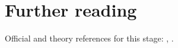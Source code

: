 \section{Further reading}
\label{sec:the_receipt:further_reading}
Official and theory references for this stage: \cite{CMS:2016lmd}, \cite{ATLAS:2014hvo}.

\begin{pitfalls}
\end{pitfalls}

\begin{exercises}
\item {}
\item {}
\end{exercises}
